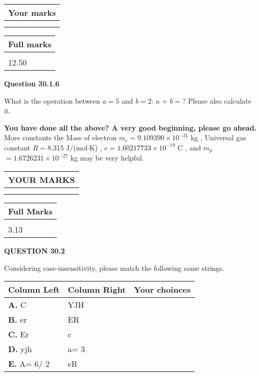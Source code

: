 \documentclass[12pt]{article}
\begin{document}
\vspace{0.2in}
  
         \begin{tabular}{|l|}
\hline
 Your marks  \\
\hline
 \\ 
 \\ 
\hline
\end{tabular}
\hspace{0.05in} \begin{tabular}{|l|}
\hline
 Full marks  \\
\hline
 \\ 
12.50 \\
\hline
\end{tabular}
{\textbf{\Large{Question
30.1.6 
}}}
  
  
What is the operation between $a= %
5$ and $b= %
2$:
$a$  %
$+$ $b=?$ Please also calculate it.

 
\vspace{0.3in}
   
   
\vspace{0.3in}
{\textbf{\LARGE{You have done all the above? A very good beginning, please go ahead.}}}
More constants the
Mass of electron
$m_e$$ =
9.109390 \times 10^{-31} $
kg
,
Universal gas constant
$R$$ =
8.315 $
J/(mol$\cdot $K)
,
$e$$ =
1.60217733 \times 10^{-19} $
C
, and
$m_p$$ =
1.6726231 \times 10^{-27} $
kg
%
may be very helpful.
\vspace{0.3in}
   
   
  
\vspace{0.2in}
  
\noindent\begin{tabular}{|l|}
\hline
 YOUR MARKS  \\
\hline
 \\ 
 \\ 
\hline
\end{tabular}
\hspace{0.05in} \begin{tabular}{|l|}
\hline
 Full Marks  \\
\hline
 \\ 
3.13 \\
\hline
\end{tabular}
{\textbf{\Large{QUESTION
30.2 
}}}
  
  
Considering case-insensitivity, please match the following same strings.
  
  
\begin{tabular}{|l|l|l|}
 \hline
 Column Left & Column Right  & Your choinces \\ 
 \hline
{\textbf{\large{
A.}}}
C
  & 
YJH
 & 
 \\ 
 \hline
{\textbf{\large{
B.}}}
er
  & 
ER
 & 
 \\ 
 \hline
{\textbf{\large{
C.}}}
Er
  & 
c
 & 
 \\ 
 \hline
{\textbf{\large{
D.}}}
yjh
  & 
 a= %
3
 & 
 \\ 
 \hline
{\textbf{\large{
E.}}}
 A= %
6/ %
2

  & 
eR
 & 
 \\ 
 \hline
 \end{tabular}
  
\end{document}
